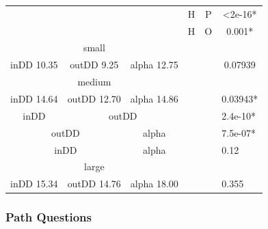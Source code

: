 \documentclass{l4proj}
\begin{document}
\begin{table}[H]
\begin{tabular}{|c|c|c|c|c|c|c|}
\multicolumn{3}{|c|}{}                    & H           & \multicolumn{2}{c|}{P}    & \textless2e-16*               \\ \cline{4-7} 
\multicolumn{3}{|c|}{}                    & H           & \multicolumn{2}{c|}{O}    & 0.001*                        \\ \hline
\multicolumn{3}{|c|}{small}               & \multicolumn{3}{c|}{\multirow{9}{*}{}}  &                               \\ \cline{1-3} \cline{7-7} 
inDD 10.35   & outDD 9.25   & alpha 12.75 & \multicolumn{3}{c|}{}                   & 0.07939                       \\ \cline{1-3} \cline{7-7} 
\multicolumn{3}{|c|}{medium}              & \multicolumn{3}{c|}{}                   &                               \\ \cline{1-3} \cline{7-7} 
inDD 14.64   & outDD 12.70  & alpha 14.86 & \multicolumn{3}{c|}{}                   & \multicolumn{1}{l|}{0.03943*} \\ \cline{1-3} \cline{7-7} 
inDD         & \multicolumn{2}{c|}{outDD} & \multicolumn{3}{c|}{}                   & \multicolumn{1}{l|}{2.4e-10*} \\ \cline{1-3} \cline{7-7} 
\multicolumn{2}{|c|}{outDD} & alpha       & \multicolumn{3}{c|}{}                   & \multicolumn{1}{l|}{7.5e-07*} \\ \cline{1-3} \cline{7-7} 
\multicolumn{2}{|c|}{inDD}  & alpha       & \multicolumn{3}{c|}{}                   & \multicolumn{1}{l|}{0.12}     \\ \cline{1-3} \cline{7-7} 
\multicolumn{3}{|c|}{large}               & \multicolumn{3}{c|}{}                   & \multicolumn{1}{l|}{}         \\ \cline{1-3} \cline{7-7} 
inDD 15.34   & outDD 14.76  & alpha 18.00 & \multicolumn{3}{c|}{}                   & \multicolumn{1}{l|}{0.355}    \\ \hline
\end{tabular}
\end{table}


\subsubsection{Path Questions}
\end{document}
